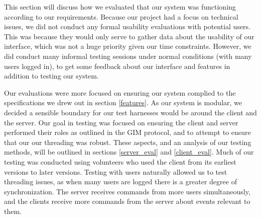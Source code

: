 This section will discuss how we evaluated that our system was functioning according to our requirements. Because our project had a focus on technical issues, we did not conduct any formal usability evaluations with potential users. This was because they would only serve to gather data about the usability of our interface, which was not a huge priority given our time constraints. However, we did conduct many informal testing sessions under normal conditions (with many users logged in), to get some feedback about our interface and features in addition to testing our system.

Our evaluations were more focused on ensuring our system complied to the specifications we drew out in section \ref{features}. As our system is modular, we decided a sensible boundary for our test harnesses would be around the client and the server. Our goal in testing was focused on ensuring the client and server performed their roles as outlined in the GIM protocol, and to attempt to ensure that our our threading was robust. These aspects, and an analysis of our testing methods, will be outlined in sections \ref{server_eval} and \ref{client_eval}. Much of our testing was conducted using volunteers who used the client from its earliest versions to later versions. Testing with users naturally allowed us to test threading issues, as when many users are logged there is a greater degree of synchronization. The server receives commands from more users simultaneously, and the clients receive more commands from the server about events relevant to them.
